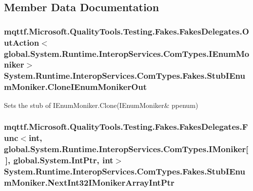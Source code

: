 \subsection{Member Data Documentation}
\hypertarget{class_system_1_1_runtime_1_1_interop_services_1_1_com_types_1_1_fakes_1_1_stub_i_enum_moniker_ab573089687e1054a53c52d59bf265ad7}{
\subsubsection[{Clone\-I\-Enum\-Moniker\-Out}]{\setlength{\rightskip}{0pt plus 5cm}mqttf.\-Microsoft.\-Quality\-Tools.\-Testing.\-Fakes.\-Fakes\-Delegates.\-Out\-Action$<$global.\-System.\-Runtime.\-Interop\-Services.\-Com\-Types.\-I\-Enum\-Moniker$>$ System.\-Runtime.\-Interop\-Services.\-Com\-Types.\-Fakes.\-Stub\-I\-Enum\-Moniker.\-Clone\-I\-Enum\-Moniker\-Out}}\label{class_system_1_1_runtime_1_1_interop_services_1_1_com_types_1_1_fakes_1_1_stub_i_enum_moniker_ab573089687e1054a53c52d59bf265ad7}


Sets the stub of I\-Enum\-Moniker.\-Clone(I\-Enum\-Moniker\& ppenum)

\hypertarget{class_system_1_1_runtime_1_1_interop_services_1_1_com_types_1_1_fakes_1_1_stub_i_enum_moniker_af68062edeb0fb31e8b243ba0251d6057}{
\subsubsection[{Next\-Int32\-I\-Moniker\-Array\-Int\-Ptr}]{\setlength{\rightskip}{0pt plus 5cm}mqttf.\-Microsoft.\-Quality\-Tools.\-Testing.\-Fakes.\-Fakes\-Delegates.\-Func$<$int, global.\-System.\-Runtime.\-Interop\-Services.\-Com\-Types.\-I\-Moniker\mbox{[}$\,$\mbox{]}, global.\-System.\-Int\-Ptr, int$>$ System.\-Runtime.\-Interop\-Services.\-Com\-Types.\-Fakes.\-Stub\-I\-Enum\-Moniker.\-Next\-Int32\-I\-Moniker\-Array\-Int\-Ptr}}\label{class_system_1_1_runtime_1_1_interop_services_1_1_com_types_1_1_fakes_1_1_stub_i_enum_moniker_af68062edeb0fb31e8b243ba0251d6057}


